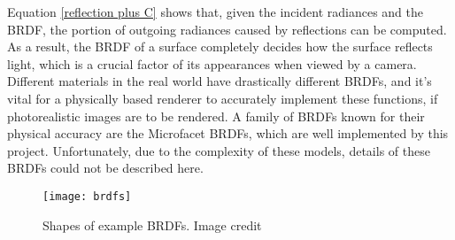 Equation \ref{reflection plus C} shows that, given the incident radiances and the BRDF, the portion of outgoing radiances caused by reflections can be computed. As a result, the BRDF of a surface completely decides how the surface reflects light, which is a crucial factor of its appearances when viewed by a camera. Different materials in the real world have drastically different BRDFs, and it's vital for a physically based renderer to accurately implement these functions, if photorealistic images are to be rendered. A family of BRDFs known for their physical accuracy are the Microfacet BRDFs, which are well implemented by this project. Unfortunately, due to the complexity of these models, details of these BRDFs could not be described here. 
\begin{figure}[H]
    \centering
    \texttt{[image: brdfs]}
    \caption{Shapes of example BRDFs. Image credit\cite{akenine2019real}}
\end{figure}

